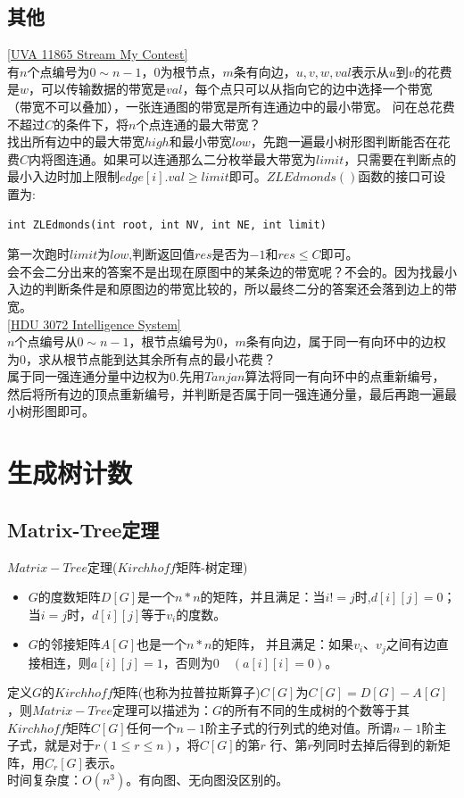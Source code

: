 \subsection{其他}
\underline {[UVA 11865 Stream My Contest]} \\

有$n$个点编号为$0\sim n-1$，0为根节点，$m$条有向边，$u,v,w,val$表示从$u$到$v$的花费是$w$，可以传输数据的带宽是$val$，每个点只可以从指向它的边中选择一个带宽（带宽不可以叠加），一张连通图的带宽是所有连通边中的最小带宽。 问在总花费不超过$C$的条件下，将$n$个点连通的最大带宽？ \\

找出所有边中的最大带宽$high$和最小带宽$low$，先跑一遍最小树形图判断能否在花费$C$内将图连通。如果可以连通那么二分枚举最大带宽为$limit$，只需要在判断点的最小入边时加上限制$edge[i].val \geq limit$即可。$ZLEdmonds()$函数的接口可设置为: \\
\begin{lstlisting}
int ZLEdmonds(int root, int NV, int NE, int limit)
\end{lstlisting}
第一次跑时$limit$为$low$,判断返回值$res$是否为$-1$和$res \leq C$即可。 \\
会不会二分出来的答案不是出现在原图中的某条边的带宽呢？不会的。因为找最小入边的判断条件是和原图边的带宽比较的，所以最终二分的答案还会落到边上的带宽。\\

\underline {[HDU 3072 Intelligence System]} \\

$n$个点编号从$0\sim n-1$，根节点编号为0，$m$条有向边，属于同一有向环中的边权为0，求从根节点能到达其余所有点的最小花费？\\

属于同一强连通分量中边权为0.先用$Tanjan$算法将同一有向环中的点重新编号，然后将所有边的顶点重新编号，并判断是否属于同一强连通分量，最后再跑一遍最小树形图即可。

\clearpage
\section{生成树计数}

\subsection{Matrix-Tree定理}

$Matrix-Tree$定理($Kirchhoff$矩阵-树定理)
\begin{itemize}
\item $G$的度数矩阵$D[G]$是一个$n*n$的矩阵，并且满足：当$i!= j$时,$d[i][j]=0$；当$i=j$时，$d[i][j]$等于$v_i$的度数。
\item $G$的邻接矩阵$A[G]$也是一个$n*n$的矩阵， 并且满足：如果$v_i、v_j$之间有边直接相连，则$a[i][j]=1$，否则为$0\quad (a[i][i]=0)$。
\end{itemize}
定义$G$的$Kirchhoff$矩阵(也称为拉普拉斯算子)$C[G]$为$C[G]=D[G]-A[G]$，则$Matrix-Tree$定理可以描述为：$G$的所有不同的生成树的个数等于其$Kirchhoff$矩阵$C[G]$任何一个$n-1$阶主子式的行列式的绝对值。所谓$n-1$阶主子式，就是对于$r(1\leq r\leq n)$，将$C[G]$的第$r$ 行、第$r$列同时去掉后得到的新矩阵，用$C_r[G]$表示。 \\
时间复杂度：$O(n^3)$。有向图、无向图没区别的。

